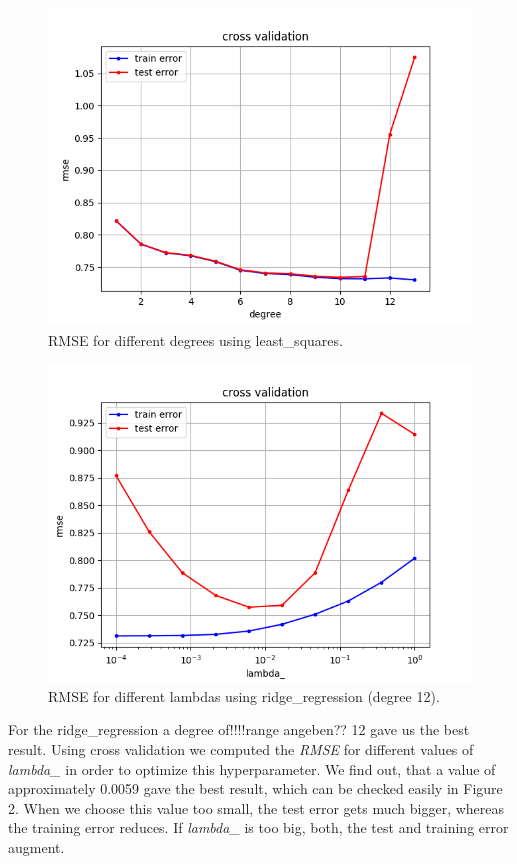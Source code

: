 \documentclass[10pt,conference,compsocconf]{IEEEtran}
\begin{document}
\begin{figure}[htbp]
  \centering
  \includegraphics[width=\columnwidth]{cross_validation_leastsquares.png}
  \caption{RMSE for different degrees using least\_squares.}
  \vspace{-3mm}
  \label{fig:crossvalidationleastsquares}
\end{figure}




\begin{figure}[htbp]
	\centering
	\includegraphics[width=\columnwidth]{cross_validation_ridge_degree_12.png}
	\caption{RMSE for different lambdas using ridge\_regression (degree 12).}
	\vspace{-3mm}
	\label{fig:crossvalidationridge}
\end{figure}
 For the ridge\_regression a degree of!!!!range angeben?? 12 gave us the best result. Using cross validation we computed the \textit{RMSE} for different values of \textit{lambda\_} in order to optimize this hyperparameter. We find out, that a value of approximately 0.0059 gave the best result, which can be checked easily in Figure 2. When we choose this value too small, the test error gets much bigger, whereas the training error reduces. If \textit{lambda\_} is too big, both, the test and training error augment.\\
\end{document}
